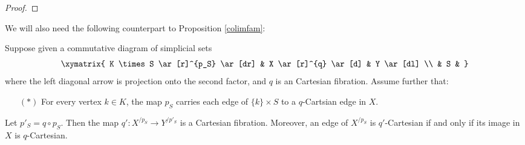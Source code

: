 \begin{proof}
\end{proof}

We will also need the following counterpart to Proposition \ref{colimfam}:

\begin{lemma}\label{limfam}
Suppose given a commutative diagram of simplicial sets
$$ \xymatrix{ K \times S \ar[r]^{p_S} \ar[dr] & X \ar[r]^{q} \ar[d] & Y \ar[dl] \\
& S & }$$
where the left diagonal arrow is projection onto the second factor, and
$q$ is an Cartesian fibration. Assume further that:
\begin{itemize}
\item[$(\ast)$] For every vertex $k \in K$, the map $p_S$ carries each
edge of $\{k \} \times S$ to a $q$-Cartsian edge in $X$.
\end{itemize}
Let $p'_S = q \circ p_S$. Then the map $q': X^{/p_S} \rightarrow Y^{/p'_S}$ is a Cartesian fibration. Moreover, an edge of $X^{/p_S}$ is $q'$-Cartesian if and only if its image in $X$ is $q$-Cartesian.
\end{lemma}

